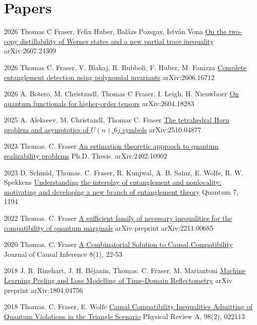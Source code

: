 \documentclass[10pt]{article}
\begin{document}
    \section{Papers}
    \begin{paperlist}
        \item{2026}
        {Thomas C Fraser, Felix Huber, Balázs Pozsgay, István Vona}
        {\href{https://arxiv.org/abs/2607.24309}{On the two-copy distillability of Werner states and a new partial trace inequality}}
        {arXiv:2607.24309}
        \item{2026}
        {Thomas C. Fraser, V. Blakaj, R. Rubboli, F. Huber, M. Fanizza}
        {\href{https://arxiv.org/abs/2606.16712}{Complete entanglement detection using polynomial invariants}}
        {arXiv:2606.16712}
        \item{2026}
        {A. Botero, M. Christandl, Thomas C Fraser, I. Leigh, H. Nieuwboer}
        {\href{https://arxiv.org/abs/2604.18283}{On quantum functionals for higher-order tensors}}
        {arXiv:2604.18283}
        \item{2025}
        {A. Alekseev, M. Christandl, Thomas C. Fraser}
        {\href{https://arxiv.org/abs/2510.04877}{The tetrahedral Horn problem and asymptotics of $U(n)$ $6j$ symbols}}
        {arXiv:2510.04877}
        \item{2023}
        {Thomas. C. Fraser}
        {\href{https://uwspace.uwaterloo.ca/items/91e64237-521a-4386-bb9e-caaf2cbc3eaa}{An estimation theoretic approach to quantum realizability problems}}
        {Ph.D. Thesis. arXiv:2402.10902}
        \item{2023}
        {D. Schmid, Thomas. C. Fraser, R. Kunjwal, A. B. Sainz, E. Wolfe, R. W. Spekkens}
        {\href{https://arxiv.org/abs/2004.09194}{Understanding the interplay of entanglement and nonlocality: motivating and developing a new branch of entanglement theory}}
        {Quantum 7, 1194}
        \item{2022}
        {Thomas. C. Fraser}
        {\href{https://arxiv.org/abs/2211.00685}{A sufficient family of necessary inequalities for the compatibility of quantum marginals}}
        {arXiv preprint arXiv:2211.00685}
        \item{2020}
        {Thomas. C. Fraser}
        {\href{https://www.degruyter.com/document/doi/10.1515/jci-2019-0013/html?lang=en}{A Combinatorial Solution to Causal Compatibility}}
        {Journal of Causal Inference 8(1), 22-53}
        \item{2018}
        {J. R. Rinehart, J. H. Béjanin, Thomas. C. Fraser, M. Mariantoni}
        {\href{https://arxiv.org/abs/1804.04756}{Machine Learning Peeling and Loss Modelling of Time-Domain Reflectometry}}
        {arXiv preprint arXiv:1804.04756}
        \item{2018}
        {Thomas. C. Fraser, E. Wolfe}
        {\href{https://journals.aps.org/pra/abstract/10.1103/PhysRevA.98.022113}{Causal Compatibility Inequalities Admitting of Quantum Violations in the Triangle Scenario}}
        {Physical Review A, 98(2), 022113}
    \end{paperlist}
\end{document}
